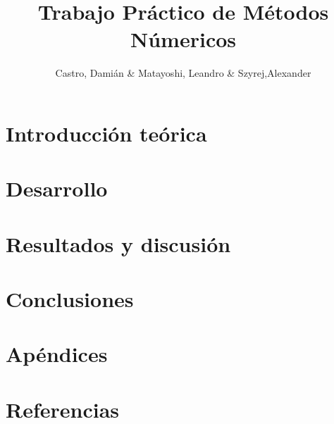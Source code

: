 \documentclass[a4paper,11pt]{article}
\title{Trabajo Práctico de Métodos Númericos}
\author{Castro, Dami\'an \& Matayoshi, Leandro \& Szyrej,Alexander}
\begin{document}


\newpage

\tableofcontents

\newpage

\section{Introducción teórica}

%

\section{Desarrollo}

%

\section{Resultados y discusión}

%

\section{Conclusiones}

%

\section{Apéndices}

%

\section{Referencias}

%
\end{document}
